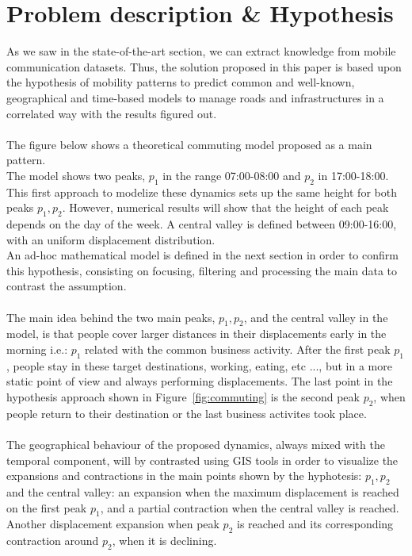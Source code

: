 \newpage

\section{Problem description \& Hypothesis}
As we saw in the state-of-the-art section, we can extract knowledge from mobile communication datasets. Thus, the solution proposed in this paper is based upon the hypothesis of mobility patterns to predict common and well-known, geographical and time-based models to manage roads and infrastructures in a correlated way with the results figured out.
\\
\\
The figure below shows a theoretical commuting model proposed as a main pattern.
\\
The model shows two peaks, $p_1$ in the range 07:00-08:00 and $p_2$ in 17:00-18:00. This first approach to modelize these dynamics sets up the same height for both peaks $p_1, p_2$. However, numerical results will show that the height of each peak depends on the day of the week. A central valley is defined between 09:00-16:00, with an uniform displacement distribution.
\\
An ad-hoc mathematical model is defined in the next section in order to confirm this hypothesis, consisting on focusing, filtering and processing the main data to contrast the assumption.
\\
\\
The main idea behind the two main peaks, $p_1, p_2$, and the central valley in the model, is that people cover larger distances in their displacements early in the morning i.e.: $p_1$ related with the common business activity. After the first peak $p_1$, people stay in these target destinations, working, eating, etc ..., but in a more static point of view and always performing displacements. The last point in the hypothesis approach shown in Figure~\ref{fig:commuting} is the second peak $p_2$, when people return to their destination or the last business activites took place.
\\
\\
The geographical behaviour of the proposed dynamics, always mixed with the temporal component, will by contrasted using GIS tools in order to visualize the expansions and contractions in the main points shown by the hyphotesis: $p_1, p_2$ and the central valley: an expansion when the maximum displacement is reached on the first peak $p_1$, and a partial contraction when the central valley is reached. Another displacement expansion when peak $p_2$ is reached and its corresponding contraction around $p_2$, when it is declining.




